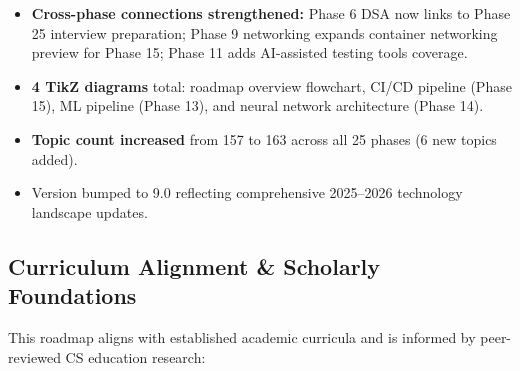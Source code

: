 \documentclass[11pt, a4paper, oneside]{report}
\begin{document}
\begin{itemize}[leftmargin=*]
\item \textbf{Cross-phase connections strengthened:} Phase 6 DSA now links to Phase 25 interview preparation; Phase 9 networking expands container networking preview for Phase 15; Phase 11 adds AI-assisted testing tools coverage.
\item \textbf{4 TikZ diagrams} total: roadmap overview flowchart, CI/CD pipeline (Phase 15), ML pipeline (Phase 13), and neural network architecture (Phase 14).
\item \textbf{Topic count increased} from 157 to 163 across all 25 phases (6 new topics added).
\item Version bumped to 9.0 reflecting comprehensive 2025--2026 technology landscape updates.
\end{itemize}


\subsection*{Curriculum Alignment \& Scholarly Foundations}

This roadmap aligns with established academic curricula and is informed by peer-reviewed CS education research:
\end{document}
